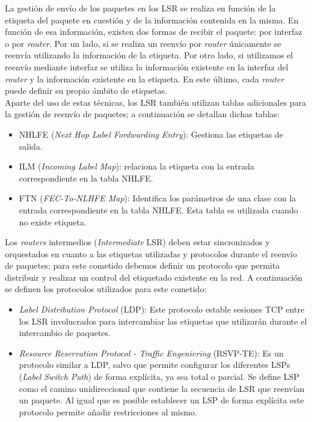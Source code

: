 	 La gestión de envío de los paquetes en los LSR se realiza en función de la etiqueta del paquete en cuestión y de la información contenida en la misma. En función de esa información, existen dos formas de recibir el paquete: por interfaz o por \textit{router}. Por un lado, si se realiza un reenvío por \textit{router} únicamente se reenvía utilizando la información de la etiqueta. Por otro lado, si utilizamos el reenvío mediante interfaz se utiliza la información existente en la interfaz del \textit{router} y la información existente en la etiqueta. En este último, cada \textit{router} puede definir su propio ámbito de etiquetas.\\
	 Aparte del uso de estas técnicas, los LSR también utilizan tablas adicionales para la gestión de reenvío de paquetes; a continuación se detallan dichas tablas:
	 \begin{itemize}
	     \item NHLFE (\textit{Next Hop Label Fordwarding Entry}): Gestiona las etiquetas de salida.
	     \item ILM (\textit{Incoming Label Map}): relaciona la etiqueta con la entrada correspondiente en la tabla NHLFE.
	     \item FTN (\textit{FEC-To-NLHFE Map}): Identifica los parámetros de una clase con la entrada correspondiente en la tabla NHLFE. Esta tabla es utilizada cuando no existe etiqueta.
	 \end{itemize}
	 Los \textit{routers} intermedios (\textit{Intermediate} LSR) deben estar sincronizados y orquestados en cuanto a las etiquetas utilizadas y protocolos durante el reenvío de paquetes; para este cometido debemos definir un protocolo que permita distribuir y realizar un control del etiquetado existente en la red. A continuación se definen los protocolos utilizados para este cometido:
	 \begin{itemize}
	     \item \textit{Label Distribution Protocol} (LDP): Este protocolo estable sesiones TCP entre los LSR involucrados para intercambiar las etiquetas que utilizarán durante el intercambio de paquetes.
	     \item \textit{Resource Reservation Protocol - Traffic Engeniering} (RSVP-TE): Es un protocolo similar a LDP, salvo que permite configurar los diferentes LSPs (\textit{Label Switch Path}) de forma explícita, ya sea total o parcial. Se define LSP como el camino unidireccional que contiene la secuencia de LSR que reenvían un paquete. Al igual que es posible establecer un LSP de forma explícita este protocolo permite añadir restricciones al mismo.
	 \end{itemize}
	 
